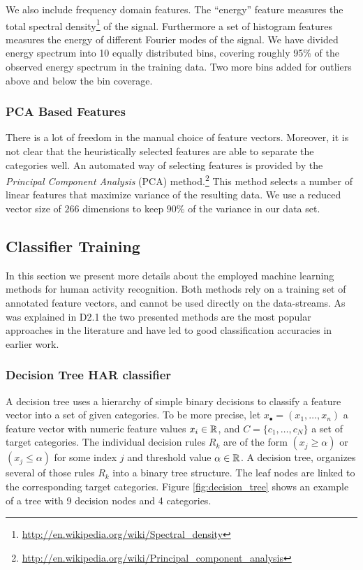 We also include frequency domain features.  The ``energy'' feature
measures the total spectral
density\footnote{\url{http://en.wikipedia.org/wiki/Spectral_density}}
of the signal. Furthermore a set of histogram features measures the
energy of different Fourier modes of the signal. We have divided
energy spectrum into 10 equally distributed bins, covering roughly
95\% of the observed energy spectrum in the training data. Two more
bins added for outliers above and below the bin coverage.

\subsubsection*{\bf PCA Based Features}

There is a lot of freedom in the manual choice of feature vectors.
Moreover, it is not clear that the heuristically selected features
are able to separate the categories well. An automated way of
selecting features is provided by the {\it Principal Component
  Analysis} (PCA) method.\footnote{\url{http://en.wikipedia.org/wiki/Principal_component_analysis}}
This method selects a number of linear features that maximize 
variance of the resulting data. We use a reduced vector size of $266$
dimensions to keep $90\%$ of the variance in our data set.

\subsection{Classifier Training}\label{sec:har_classifier_training}

In this section we present more details about the employed machine
learning methods for human activity recognition. Both methods rely on
a training set of annotated feature vectors, and cannot be used
directly on the data-streams. As was explained in D2.1 the two
presented methods are the most popular approaches in the literature
and have led to good classification accuracies in earlier work.

\subsubsection*{{\bf Decision Tree HAR classifier}}
\label{sec:DectionTree}

A decision tree uses a hierarchy of simple binary decisions to
classify a feature vector into a set of given categories.  To be more
precise, let $x_\bullet = (x_1, \dots, x_n)$ a feature vector with numeric
feature values $x_i \in \mathbb{R}$, and $C=\{c_1, \dots, c_N\}$ a set of
target categories. The individual decision rules $R_k$ are of the form
$(x_j \geq \alpha)$ or $(x_j \leq \alpha)$ for some index $j$ and
threshold value $\alpha \in \mathbb{R}$.  A decision tree, organizes several
of those rules $R_k$ into a binary tree structure. The leaf nodes are
linked to the corresponding target categories. Figure
\ref{fig:decision_tree} shows an example of a tree with 9 decision
nodes and 4 categories.

